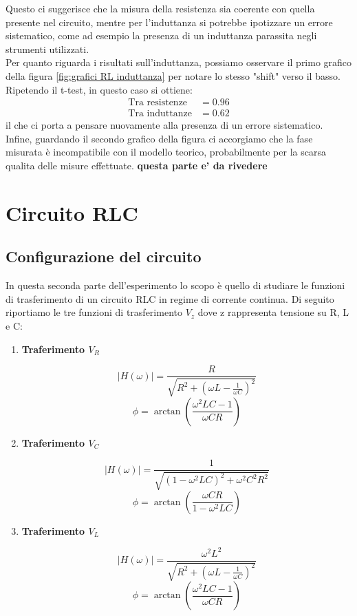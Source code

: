 \documentclass[letterpaper,12pt]{article}
\begin{document}
Questo ci suggerisce che la misura della resistenza sia coerente con quella presente nel circuito, mentre per l'induttanza si potrebbe ipotizzare un errore sistematico, come ad esempio la presenza di un induttanza parassita negli strumenti utilizzati. \\

Per quanto riguarda i risultati sull'induttanza, possiamo osservare il primo grafico della figura \ref{fig:grafici RL induttanza} per notare lo stesso "shift" verso il basso. Ripetendo il t-test, in questo caso si ottiene:
\begin{align*}
    \text{Tra resistenze} & = 0.96 \\
    \text{Tra induttanze} & = 0.62
\end{align*}
il che ci porta a pensare nuovamente alla presenza di un errore sistematico. \\

Infine, guardando il secondo grafico della figura ci accorgiamo che la fase misurata è incompatibile con il modello teorico, probabilmente per la scarsa qualita delle misure effettuate. \textbf{questa parte e' da rivedere}


\newpage
\section{Circuito RLC}

\subsection{Configurazione del circuito}
In questa seconda parte dell'esperimento lo scopo è quello di studiare le funzioni di trasferimento di un circuito RLC in regime di corrente continua.
Di seguito riportiamo le tre funzioni di trasferimento $V_z$ dove z rappresenta tensione su R, L e C:

\begin{enumerate}
	\item \textbf{Traferimento $V_R$}

	      $$|H(\omega)| = \frac{R}{\sqrt{R^2 + (\omega L - \frac{1}{\omega C})^2}}$$
	      $$ \phi = \arctan(\frac{\omega^2LC -1 }{\omega CR})$$

	\item \textbf{Traferimento $V_C$}

	      $$|H(\omega)| = \frac{1}{\sqrt{(1-\omega^2LC)^2 + \omega^2C^2R^2}}$$
	      $$ \phi = \arctan(\frac{\omega CR}{1 - \omega^2 LC})$$

	\item \textbf{Traferimento $V_L$}

	      $$|H(\omega)| = \frac{\omega^2 L^2}{\sqrt{R^2 + (\omega L - \frac{1}{\omega C})^2}}$$
	      $$ \phi = \arctan(\frac{\omega^2LC -1 }{\omega CR})$$
\end{enumerate}
\end{document}
